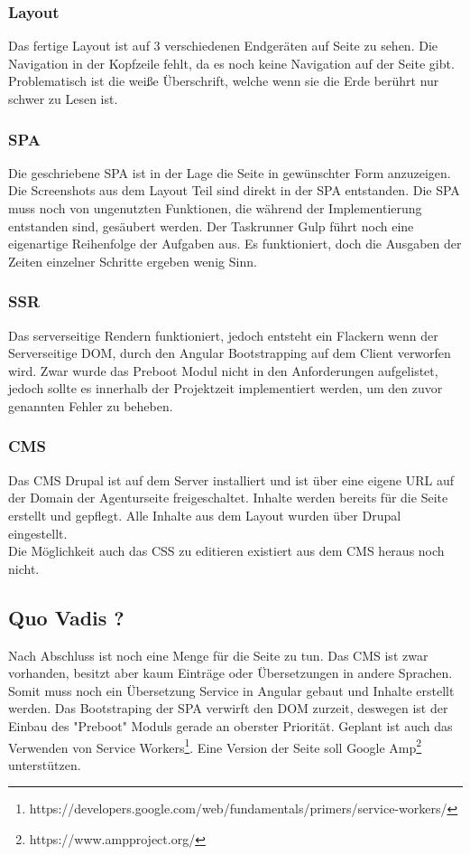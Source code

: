 \documentclass[11pt,a4paper]{article}
\begin{document}
\subsubsection{Layout}
Das fertige Layout ist auf 3 verschiedenen Endgeräten auf Seite \pageref{sec:responsive}
zu sehen. Die Navigation in der Kopfzeile fehlt, da es noch keine Navigation auf der Seite gibt.
Problematisch ist die weiße Überschrift, welche wenn sie die Erde berührt nur schwer zu Lesen ist.
\subsubsection{SPA}
Die geschriebene SPA ist in der Lage die Seite in gewünschter Form anzuzeigen. Die Screenshots aus dem Layout Teil sind direkt in der SPA entstanden. Die SPA muss noch von ungenutzten Funktionen, die während der Implementierung entstanden sind, gesäubert werden. Der Taskrunner Gulp führt noch eine eigenartige Reihenfolge der Aufgaben aus. Es funktioniert, doch die Ausgaben der Zeiten einzelner Schritte ergeben wenig Sinn.
\subsubsection{SSR}
Das serverseitige Rendern funktioniert, jedoch entsteht ein Flackern wenn der Serverseitige DOM, durch den Angular Bootstrapping auf dem Client verworfen wird. Zwar wurde das Preboot Modul nicht in den Anforderungen aufgelistet, jedoch sollte es innerhalb der Projektzeit implementiert werden, um den zuvor genannten Fehler zu beheben.
\subsubsection{CMS}
Das \acs{CMS} Drupal ist auf dem Server installiert und ist über eine eigene URL auf der Domain der Agenturseite freigeschaltet. Inhalte werden bereits für die Seite erstellt und gepflegt. Alle Inhalte aus dem Layout wurden über Drupal eingestellt.\\
Die Möglichkeit auch das CSS zu editieren existiert aus dem CMS heraus noch nicht.
\subsection{Quo Vadis ?}
Nach Abschluss ist noch eine Menge für die Seite zu tun.
Das CMS ist zwar vorhanden, besitzt aber kaum Einträge oder Übersetzungen in andere Sprachen.
Somit muss noch ein Übersetzung Service in Angular gebaut und Inhalte erstellt werden. Das Bootstraping der SPA verwirft den DOM zurzeit, deswegen ist der Einbau des "Preboot" Moduls gerade an oberster Priorität. Geplant ist auch das Verwenden von Service Workers\footnote{https://developers.google.com/web/fundamentals/primers/service-workers/}. Eine Version der Seite soll Google Amp\footnote{https://www.ampproject.org/} unterstützen.
\end{document}
